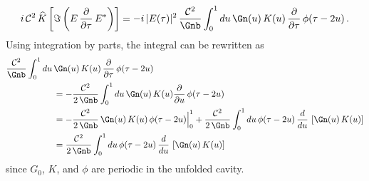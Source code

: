 \begin{equation}
    i\, \mathcal{C}^2\, \widehat{K}\left[\Im\left(E\,\frac{\partial}{\partial \tau}\, E^\ast\right)\right] = -i\, |E(\tau)|^2\, \frac{\mathcal{C}^2}{\Gnb} \int_{0}^{1} d u\, \Gn(u)\, K(u)\, \frac{\partial}{\partial \tau}\, \phi(\tau - 2 u)\, .
\end{equation}
Using integration by parts, the integral can be rewritten as
\begin{equation} \label{eqn:mflt_nlo_ibp}
    \begin{split}
        \frac{\mathcal{C}^2}{\Gnb} \int_{0}^{1} d u\, & \Gn(u)\, K(u)\, \frac{\partial}{\partial \tau}\, \phi(\tau - 2 u) \\
       &= -\frac{\mathcal{C}^2}{2\, \Gnb} \int_{0}^{1} d u\, \Gn(u)\, K(u) \frac{\partial}{\partial u}\, \phi(\tau - 2 u) \\
        &= -\frac{\mathcal{C}^2}{2\, \Gnb}\, \Gn(u)\, K(u)\, \phi(\tau - 2 u) \Big|_0^1 + \frac{\mathcal{C}^2}{2\, \Gnb} \int_{0}^{1} d u\, \phi(\tau - 2 u)\, \frac{d}{d u}\, \left[\Gn(u)\, K(u)\right] \\
        &= \frac{\mathcal{C}^2}{2\, \Gnb} \int_{0}^{1} d u\, \phi(\tau - 2 u)\, \frac{d}{d u}\, \left[\Gn(u)\, K(u)\right]
    \end{split}
\end{equation}
since $G_0$, $K$, and $\phi$ are periodic in the unfolded cavity.

